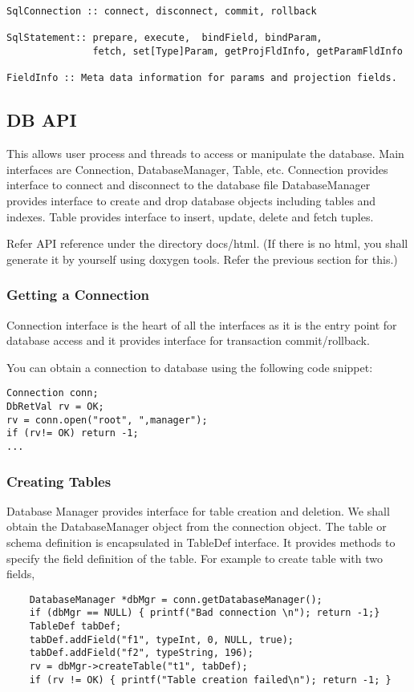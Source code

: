 \documentclass[12pt]{article}
\begin{document}
\begin{verbatim}
SqlConnection :: connect, disconnect, commit, rollback

SqlStatement:: prepare, execute,  bindField, bindParam,
               fetch, set[Type]Param, getProjFldInfo, getParamFldInfo

FieldInfo :: Meta data information for params and projection fields.
\end{verbatim}


\subsection{DB API}
\label{dbapi}
This allows user process and threads to access or manipulate the database. Main interfaces are Connection, DatabaseManager, Table, etc.
Connection provides interface to connect and disconnect to the database file
DatabaseManager provides interface to create and drop database objects including tables and indexes.
Table provides interface to insert, update, delete and fetch tuples.

Refer API reference under the directory docs/html. (If there is no html, you shall generate it by yourself using doxygen tools. Refer the previous section for this.)

\subsubsection{Getting a Connection}
\label{getconn}
Connection interface is the heart of all the interfaces as it is the entry point for database access and it provides interface for transaction commit/rollback.

You can obtain a connection to database using the following code snippet:

\begin{verbatim}
Connection conn;
DbRetVal rv = OK;
rv = conn.open("root", ",manager");
if (rv!= OK) return -1;
...
\end{verbatim}

\subsubsection{Creating Tables}
\label{createtable}
Database Manager provides interface for table creation and deletion. We shall obtain the DatabaseManager object from the connection object. The table or schema definition is encapsulated in TableDef interface. It provides methods to specify the field definition of the table.
For example to create table with two fields, 
\begin{verbatim}
    DatabaseManager *dbMgr = conn.getDatabaseManager();
    if (dbMgr == NULL) { printf("Bad connection \n"); return -1;}
    TableDef tabDef;
    tabDef.addField("f1", typeInt, 0, NULL, true);
    tabDef.addField("f2", typeString, 196);
    rv = dbMgr->createTable("t1", tabDef);
    if (rv != OK) { printf("Table creation failed\n"); return -1; }
\end{verbatim}
\end{document}
